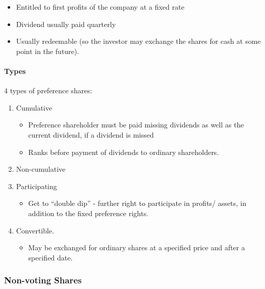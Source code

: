 \documentclass[
]{article}
\providecommand{\tightlist}{%
  \setlength{\itemsep}{0pt}\setlength{\parskip}{0pt}}
\begin{document}
\begin{itemize}
\tightlist
\item
  Entitled to first profits of the company at a fixed rate
\item
  Dividend usually paid quarterly
\item
  Usually redeemable (so the investor may exchange the shares for cash
  at some point in the future).
\end{itemize}

\hypertarget{types}{%
\paragraph{Types}\label{types}}

4 types of preference shares:

\begin{enumerate}
\def\labelenumi{\arabic{enumi}.}
\tightlist
\item
  Cumulative

  \begin{itemize}
  \tightlist
  \item
    Preference shareholder must be paid missing dividends as well as the
    current dividend, if a dividend is missed
  \item
    Ranks before payment of dividends to ordinary shareholders.
  \end{itemize}
\item
  Non-cumulative
\item
  Participating

  \begin{itemize}
  \tightlist
  \item
    Get to ``double dip'' - further right to participate in profits/
    assets, in addition to the fixed preference rights.
  \end{itemize}
\item
  Convertible.

  \begin{itemize}
  \tightlist
  \item
    May be exchanged for ordinary shares at a specified price and after
    a specified date.
  \end{itemize}
\end{enumerate}

\hypertarget{non-voting-shares-1}{%
\subsubsection{Non-voting Shares}\label{non-voting-shares-1}}
\end{document}
